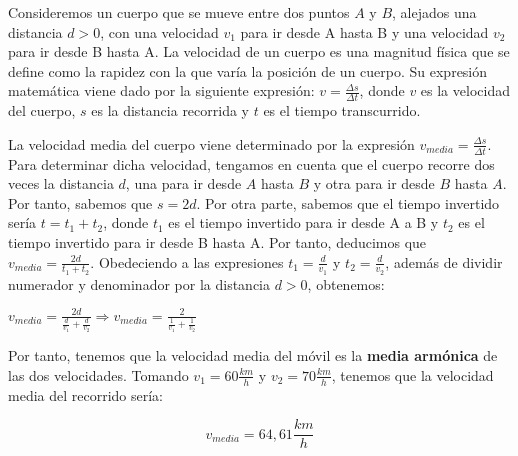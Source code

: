 Consideremos un cuerpo que se mueve entre dos puntos $A$ y $B$, alejados una distancia $d > 0$, con una velocidad $v_{1}$ para ir desde A hasta B y una velocidad $v_{2}$ para ir desde B hasta A. La velocidad de un cuerpo es una magnitud física que se define como la rapidez con la que varía la posición de un cuerpo. Su expresión matemática viene dado por la siguiente expresión: $v = \frac{\Delta s}{\Delta t}$, donde $v$ es la velocidad del cuerpo, $s$ es la distancia recorrida y $t$ es el tiempo transcurrido. 

La velocidad media del cuerpo viene determinado por la expresión $v_{media} = \frac{\Delta s}{\Delta t}$. Para determinar dicha velocidad, tengamos en cuenta que el cuerpo recorre dos veces la distancia $d$, una para ir desde $A$ hasta $B$ y otra para ir desde $B$ hasta $A$. Por tanto, sabemos que $s = 2d$. Por otra parte, sabemos que el tiempo invertido sería $t = t_{1} + t_{2}$, donde $t_{1}$ es el tiempo invertido para ir desde A a B y $t_{2}$ es el tiempo invertido para ir desde B hasta A. Por tanto, deducimos que $v_{media} = \frac{2d}{t_{1} + t_{2}}$. Obedeciendo a las expresiones $t_{1} = \frac{d}{v_{1}}$ y $t_{2} = \frac{d}{v_{2}}$, además de dividir numerador y denominador por la distancia $d > 0$, obtenemos:

\begin{center}
	$v_{media} = \frac{2d}{\frac{d}{v_{1}} + \frac{d}{v_{2}}} 	\Rightarrow  v_{media} = \frac{2}{\frac{1}{v_{1}} + \frac{1}{v_{2}}}$
\end{center}

Por tanto, tenemos que la velocidad media del móvil es la \textbf{media armónica} de las dos velocidades. Tomando $v_{1} = 60 \frac{km}{h}$ y $v_{2} = 70 \frac{km}{h}$, tenemos que la velocidad media del recorrido sería:

\begin{equation}
	v_{media} = 64,61 \frac{km}{h}
\end{equation}